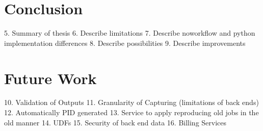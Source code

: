 \documentclass[draft,final]{vutinfth} %
\begin{document}
\section{Conclusion}

5.	Summary of thesis
6.	Describe limitations
7.	Describe noworkflow and python implementation differences 
8.	Describe possibilities
9.	Describe improvements

\section{Future Work}

10.	Validation of Outputs
11.	Granularity of Capturing (limitations of back ends)
12.	Automatically PID generated
13.	Service to apply reproducing old jobs in the old manner
14.	UDFs
15.	Security of back end data
16.	Billing Services



\backmatter

\listoffigures %

\cleardoublepage %
\listoftables %


\printindex

\printglossaries



\end{document}
